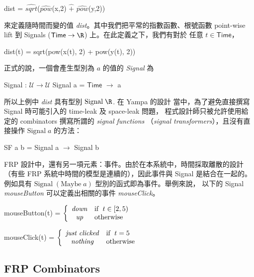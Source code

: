 \documentclass{article}
\newcommand{\Time}{\mathsf{Time}}
\newcommand{\U}{\mathcal{U}}
\begin{document}
  \begin{code}
  dist = $\widehat{\mathit{sqrt}}$($\widehat{\mathit{pow}}$(x,2) $\widehat{+}$ $\widehat{\mathit{pow}}$(y,2))
  \end{code}

  來定義隨時間而變的值 \textit{dist}。其中我們把平常的指數函數、根號函數
  point-wise lift 到 Signals ($\Time\to\R$) 上。在此定義之下，我們有對於
  任意 $t\in\Time$，

  \begin{code}
  dist(t) = sqrt(pow(x(t), 2) + pow(y(t), 2))
  \end{code}

  正式的說，一個會產生型別為 $a$ 的值的 \emph{Signal} 為

  \begin{code}
  Signal : $\U\to\U$
  Signal a = $\Time$ $\to$ a
  \end{code}

  所以上例中 \textit{dist} 具有型別 $\text{Signal}\; \R$. 在 Yampa 的設計
  當中，為了避免直接撰寫 Signal 時可能引入的 time-leak 及 space-leak 問題，
  程式設計師只被允許使用給定的 combinators 撰寫所謂的 \emph{signal functions}
  （\emph{signal transformers}），且沒有直接操作 $\text{Signal}\; a$ 的方法：

  \begin{code}
  SF a b = Signal a $\to$ Signal b
  \end{code}

  FRP 設計中，還有另一項元素：事件。由於在本系統中，時間採取離散的設計
  （有些 FRP 系統中時間的模型是連續的），因此事件與 Signal 是結合在一起的。
  例如具有 $\text{Signal}\;(\text{Maybe}\;a)$ 型別的函式即為事件。舉例來說，
  以下的 Signal \textit{mouseButton} 可以定義出相關的事件
  \textit{mouseClick}。

  \begin{code}
  mouseButton(t) = $\displaystyle \left\{ \begin{array}{cl} \mathit{down} & \text{if\; } t\in [2,5) \\ \mathit{up} & \text{otherwise} \end{array} \right.$

  mouseClick(t) = $\displaystyle \left\{ \begin{array}{cl} \mathit{just\; clicked} & \text{if\; } t=5 \\ \mathit{nothing} & \text{otherwise} \end{array} \right.$
  \end{code}


  \subsection{FRP Combinators}
\end{document}
